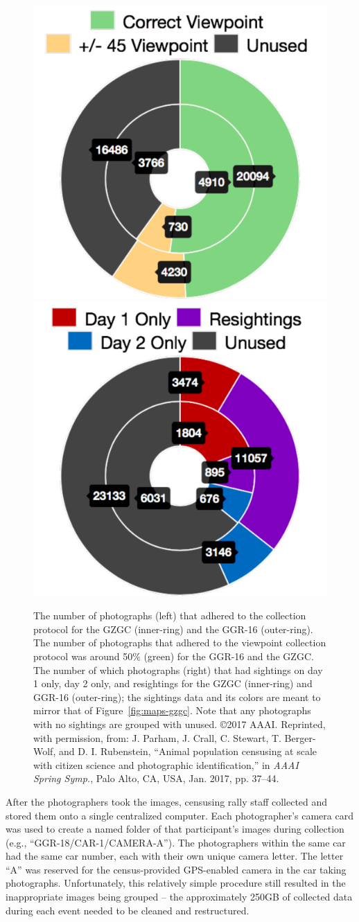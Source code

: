 \begin{figure}[!t]
    \begin{center}
        \includegraphics[width=0.48\linewidth]{resources/images-used-viewpoint.pdf}
        \includegraphics[width=0.48\linewidth]{resources/images-used-resights-all.pdf}
    \end{center}
    \caption{The number of photographs (left) that adhered to the collection protocol for the GZGC (inner-ring) and the GGR-16 (outer-ring).  The number of photographs that adhered to the viewpoint collection protocol was around 50\% (green) for the GGR-16 and the GZGC.  The number of which photographs (right) that had sightings on day 1 only, day 2 only, and resightings for the GZGC (inner-ring) and GGR-16 (outer-ring); the sightings data and its colors are meant to mirror that of Figure~\ref{fig:maps-gzgc}.  Note that any photographs with no sightings are grouped with unused.  \copyright 2017 AAAI. Reprinted, with permission, from: J. Parham, J. Crall, C. Stewart, T. Berger-Wolf, and D. I. Rubenstein, ``Animal population censusing at scale with citizen science and photographic identification,'' in \textit{AAAI Spring Symp.}, Palo Alto, CA, USA, Jan. 2017, pp. 37–44.}
    \label{fig:breakdown}
\end{figure}

After the photographers took the images, censusing rally staff collected and stored them onto a single centralized computer.  Each photographer's camera card was used to create a named folder of that participant's images during collection (e.g., ``GGR-18/CAR-1/CAMERA-A'').  The photographers within the same car had the same car number, each with their own unique camera letter.  The letter ``A'' was reserved for the census-provided GPS-enabled camera in the car taking photographs.  Unfortunately, this relatively simple procedure still resulted in the inappropriate images being grouped -- the approximately 250GB of collected data during each event needed to be cleaned and restructured.

